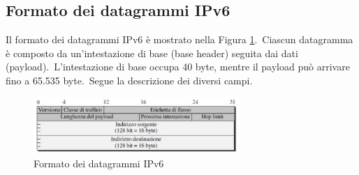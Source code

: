 \subsection{Formato dei datagrammi IPv6}

Il formato dei datagrammi IPv6 è mostrato nella Figura \ref{fig:IPv6}.\
Ciascun datagramma è composto da un'intestazione di base (base header) seguita dai dati (payload).\
L'intestazione di base occupa 40 byte, mentre il payload può arrivare fino a 65.535 byte.\
Segue la descrizione dei diversi campi.
\begin{figure}[H]
    \centering
    \includegraphics[width=0.7\textwidth]{immagini/IPv6.jpg}
    \caption{Formato dei datagrammi IPv6}
    \label{fig:IPv6}
\end{figure}

